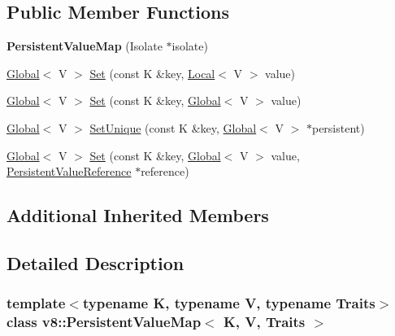 \subsection*{Public Member Functions}
\begin{DoxyCompactItemize}
\item 
\mbox{\label{classv8_1_1PersistentValueMap_af8000a75ef84fa719724dc4dadc1e5ee}} 
{\bfseries Persistent\+Value\+Map} (Isolate $\ast$isolate)
\item 
\mbox{\hyperlink{classv8_1_1Global}{Global}}$<$ V $>$ \mbox{\hyperlink{classv8_1_1PersistentValueMap_a4527a2e1b25a9f1772317f948382d9f9}{Set}} (const K \&key, \mbox{\hyperlink{classv8_1_1Local}{Local}}$<$ V $>$ value)
\item 
\mbox{\hyperlink{classv8_1_1Global}{Global}}$<$ V $>$ \mbox{\hyperlink{classv8_1_1PersistentValueMap_a00f89f1b7665698349f98b04d0059180}{Set}} (const K \&key, \mbox{\hyperlink{classv8_1_1Global}{Global}}$<$ V $>$ value)
\item 
\mbox{\hyperlink{classv8_1_1Global}{Global}}$<$ V $>$ \mbox{\hyperlink{classv8_1_1PersistentValueMap_a97ab74c7670e65dd5f95ec2940c4ab11}{Set\+Unique}} (const K \&key, \mbox{\hyperlink{classv8_1_1Global}{Global}}$<$ V $>$ $\ast$persistent)
\item 
\mbox{\hyperlink{classv8_1_1Global}{Global}}$<$ V $>$ \mbox{\hyperlink{classv8_1_1PersistentValueMap_a8128f8cff6ed0f3177e966b28cc081ba}{Set}} (const K \&key, \mbox{\hyperlink{classv8_1_1Global}{Global}}$<$ V $>$ value, \mbox{\hyperlink{classv8_1_1PersistentValueMapBase_1_1PersistentValueReference}{Persistent\+Value\+Reference}} $\ast$reference)
\end{DoxyCompactItemize}
\subsection*{Additional Inherited Members}


\subsection{Detailed Description}
\subsubsection*{template$<$typename K, typename V, typename Traits$>$\newline
class v8\+::\+Persistent\+Value\+Map$<$ K, V, Traits $>$}



